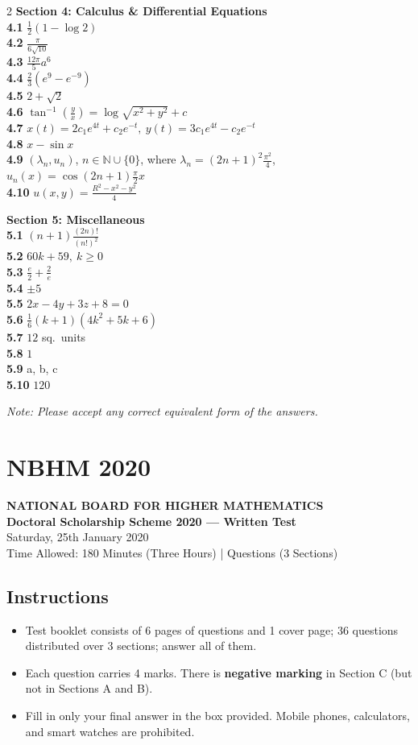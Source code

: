 \documentclass[11pt,a4paper]{article}
\newcommand{\N}{\mathbb{N}}
\newcommand{\examheader}[4]{%
  \clearpage
  \section{#1}
  \begin{center}
    {\large\bfseries NATIONAL BOARD FOR HIGHER MATHEMATICS}\\[3pt]
    {\bfseries #2}\\[2pt]
    {#3}\\[2pt]
    {\small #4}
  \end{center}
  \vspace{4pt}
}
\begin{document}
\begin{multicols}{2}
\medskip
\textbf{Section 4: Calculus \& Differential Equations}\\
\textbf{4.1} $\frac{1}{2}(1 - \log 2)$\\
\textbf{4.2} $\frac{\pi}{6\sqrt{10}}$\\
\textbf{4.3} $\frac{12\pi}{5}a^6$\\
\textbf{4.4} $\frac{2}{3}(e^9 - e^{-9})$\\
\textbf{4.5} $2 + \sqrt{2}$\\
\textbf{4.6} $\tan^{-1}\left(\frac{y}{x}\right) = \log\sqrt{x^2 + y^2} + c$\\
\textbf{4.7} $x(t) = 2c_1 e^{4t} + c_2 e^{-t},\ y(t) = 3c_1 e^{4t} - c_2 e^{-t}$\\
\textbf{4.8} $x - \sin x$\\
\textbf{4.9} $(\lambda_n, u_n)$, $n \in \N \cup \{0\}$, where $\lambda_n = (2n+1)^2\frac{\pi^2}{4}$, $u_n(x) = \cos(2n+1)\frac{\pi}{2}x$\\
\textbf{4.10} $u(x, y) = \frac{R^2 - x^2 - y^2}{4}$

\medskip
\textbf{Section 5: Miscellaneous}\\
\textbf{5.1} $(n + 1)\frac{(2n)!}{(n!)^2}$\\
\textbf{5.2} $60k + 59,\ k \ge 0$\\
\textbf{5.3} $\frac{e}{2} + \frac{2}{e}$\\
\textbf{5.4} $\pm 5$\\
\textbf{5.5} $2x - 4y + 3z + 8 = 0$\\
\textbf{5.6} $\frac{1}{6}(k + 1)(4k^2 + 5k + 6)$\\
\textbf{5.7} $12$ sq.\ units\\
\textbf{5.8} $1$\\
\textbf{5.9} a, b, c\\
\textbf{5.10} $120$

\medskip
\noindent\emph{Note: Please accept any correct equivalent form of the answers.}
\end{multicols}
\examheader{NBHM 2020}{Doctoral Scholarship Scheme 2020 --- Written Test}{Saturday, 25th January 2020}{Time Allowed: 180 Minutes (Three Hours) \quad|\quad 36 Questions (3 Sections)}

\subsection*{Instructions}
\begin{itemize}
  \item Test booklet consists of 6 pages of questions and 1 cover page; 36 questions distributed over 3 sections; answer all of them.
  \item Each question carries 4 marks. There is \textbf{negative marking} in Section C (but not in Sections A and B).
  \item Fill in only your final answer in the box provided. Mobile phones, calculators, and smart watches are prohibited.
\end{itemize}
\end{document}
